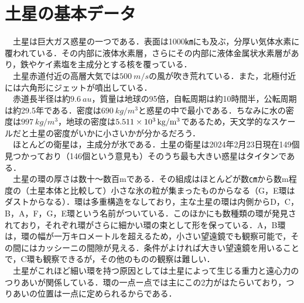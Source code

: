 \documentclass[../main]{subfiles}
\begin{document}
\section{土星の基本データ}
　土星は巨大ガス惑星の一つである．表面は1000㎞にも及ぶ，分厚い気体水素に覆われている．その内部に液体水素層，さらにその内部に液体金属状水素層があり，鉄やケイ素塩を主成分とする核を覆っている．\\
　土星赤道付近の高層大気では$\SI[mode=text]{500}{m/s}$の風が吹き荒れている．また，北極付近には六角形にジェットが噴出している．\\
　赤道長半径は約$\SI[mode=text]{9.6}{au}$，質量は地球の95倍，自転周期は約10時間半，公転周期は約29.5年である．密度は$\SI[mode=text]{690}{kg/m^3}$と惑星の中で最小である．ちなみに水の密度は$\SI[mode=text]{997}{kg/m^3}$，地球の密度は$\SI[mode=text]{5.511E3}{kg/m^3}$であるため，天文学的なスケールだと土星の密度がいかに小さいかが分かるだろう．\\
　ほとんどの衛星は，主成分が氷である．土星の衛星は2024年2月23日現在149個見つかっており（146個という意見も）そのうち最も大きい惑星はタイタンである．\\
　土星の環の厚さは数十〜数百mである．その組成はほとんどが数㎝から数m程度の（土星本体と比較して）小さな氷の粒が集まったものからなる（G，E環はダストからなる）．環は多重構造をなしており，主な土星の環は内側からD，C，B，A，F，G，E環という名前がついている．このほかにも数種類の環が発見されており，それぞれ環がさらに細かい環の束として形を保っている．A，B環は，環の幅が一万キロメートルを超えるため，小さい望遠鏡でも観察可能で，その間にはカッシーニの間隙が見える．条件がよければ大きい望遠鏡を用いることで，C環も観察できるが，その他のものの観察は難しい．\\
　土星がこれほど細い環を持つ原因としては土星によって生じる重力と遠心力のつりあいが関係している．環の一点ー点では主にこの2力がはたらいており，つりあいの位置は一点に定められるからである．
\end{document}
